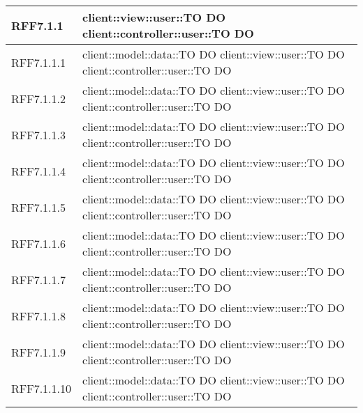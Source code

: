 \begin{center}
\begin{longtable}{| p{2.5cm} | p{11cm} |}
\hline
RFF7.1.1 & client::view::user::TO DO \newline client::controller::user::TO DO\\
\hline
RFF7.1.1.1 & client::model::data::TO DO \newline client::view::user::TO DO \newline client::controller::user::TO DO\\
\hline
RFF7.1.1.2 & client::model::data::TO DO \newline client::view::user::TO DO \newline client::controller::user::TO DO\\
\hline
RFF7.1.1.3 & client::model::data::TO DO \newline client::view::user::TO DO \newline client::controller::user::TO DO\\
\hline
RFF7.1.1.4 & client::model::data::TO DO \newline client::view::user::TO DO \newline client::controller::user::TO DO\\
\hline
RFF7.1.1.5 & client::model::data::TO DO \newline client::view::user::TO DO \newline client::controller::user::TO DO\\
\hline
RFF7.1.1.6 & client::model::data::TO DO \newline client::view::user::TO DO \newline client::controller::user::TO DO\\
\hline
RFF7.1.1.7 & client::model::data::TO DO \newline client::view::user::TO DO \newline client::controller::user::TO DO\\
\hline
RFF7.1.1.8 & client::model::data::TO DO \newline client::view::user::TO DO \newline client::controller::user::TO DO\\
\hline
RFF7.1.1.9 & client::model::data::TO DO \newline client::view::user::TO DO \newline client::controller::user::TO DO\\
\hline
RFF7.1.1.10 & client::model::data::TO DO \newline client::view::user::TO DO \newline client::controller::user::TO DO\\

\end{longtable}
\end{center}
